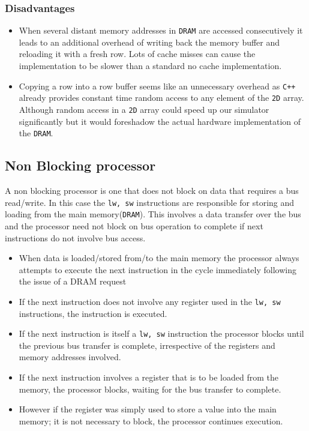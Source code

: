 \documentclass[hidelinks,12pt]{article}
\begin{document}
\subsubsection{Disadvantages}
\begin{itemize}
    \item When several distant memory addresses in \verb|DRAM| are accessed consecutively it leads to an additional overhead of writing back the memory buffer and reloading it with a fresh row.
          Lots of cache misses can cause the implementation to be slower than a standard no cache implementation.
    \item Copying a row into a row buffer seems like an unnecessary overhead as \verb|C++| already provides constant time random access to any element of the \verb|2D| array.
          Although random access in a \verb|2D| array could speed up our simulator significantly but it would foreshadow the actual hardware implementation of the \verb|DRAM|.
\end{itemize}

\subsection{Non Blocking processor}
A non blocking processor is one that does not block on data that requires a bus read/write. In this case the \verb|lw, sw| instructions
are responsible for storing and loading from the main memory(\verb|DRAM|). This involves a data transfer over the bus and the processor need not block on
bus operation to complete if next instructions do not involve bus access.
\begin{itemize}
    \item When data is loaded/stored from/to the main memory the processor always attempts to execute the next instruction in the cycle immediately following the issue of a DRAM request
    \item If the next instruction does not involve any register used in the \verb|lw, sw| instructions, the instruction is executed.
    \item If the next instruction is itself a \verb|lw, sw| instruction the processor blocks until the previous bus transfer is complete, irrespective of the registers and memory addresses involved.
    \item If the next instruction involves a register that is to be loaded from the memory, the processor blocks, waiting for the bus transfer to complete.
    \item However if the register was simply used to store a value into the main memory; it is not necessary to block, the processor continues execution.
\end{itemize}
\end{document}
